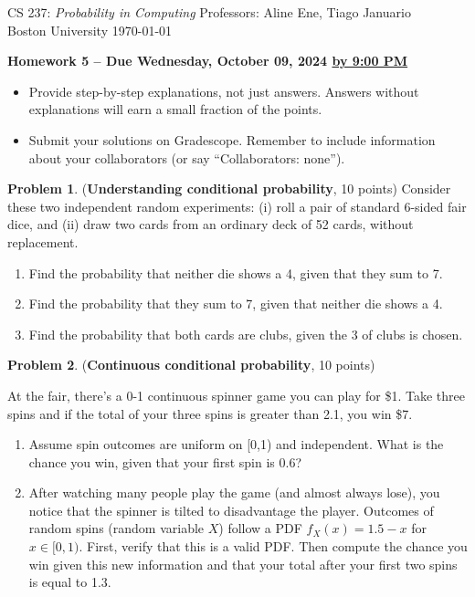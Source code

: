 \documentclass[letterpaper,11pt]{article}
\theoremstyle{plain}%
\theoremstyle{definition}
\newtheorem{problem}{Problem}
\theoremstyle{plain}%
\begin{document}
{\noindent\large
CS 237: {\em Probability in Computing} \hfill Professors: Aline Ene, Tiago Januario\\
Boston University \hfill \today\\}
\vspace{1pt} \hrulefill\vspace{3mm}
\begin{center}
{\Large\bf Homework 5 -- Due Wednesday, October 09, 2024 \underline{by 9:00 PM}}
\end{center}

\begin{itemize}
\item Provide step-by-step explanations, not just answers. Answers without explanations will earn a small fraction of the points.
\item Submit your solutions on Gradescope. Remember to include information about your collaborators (or say ``Collaborators: none'').
\end{itemize}

\vspace*{-2mm}

\begin{problem}(\textbf{Understanding conditional probability}, 10 points) Consider these two independent random experiments: (i) roll a pair of standard 6-sided fair dice, and (ii) draw two cards from an ordinary deck of 52 cards, without replacement.
    \begin{enumerate}[label=(\alph*)]
        \item Find the probability that neither die shows a 4, given that they sum to 7.
        \item Find the probability that they sum to 7, given that neither die shows a 4.
        \item Find the probability that both cards are clubs, given the 3 of clubs is chosen.
    \end{enumerate}
\end{problem}

\begin{problem} ({\bf Continuous conditional probability}, 10 points)

At the fair, there's a 0-1 continuous spinner game you can play for \$1. Take three spins and if the total of your three spins is greater than 2.1, you win \$7. 

\begin{enumerate}[label=(\alph*)]
 
\item  Assume spin outcomes are uniform on [0,1) and independent.  What is the chance you win, given that your first spin is 0.6?
\item  After watching many people play the game (and almost always lose), you notice that the spinner is tilted to disadvantage the player.  Outcomes of random spins (random variable $X$) follow a PDF $f_X(x) = 1.5 - x$ for $x \in [0,1)$. First, verify that this is a valid PDF. Then compute the chance you win given this new information and that your total after your first two spins is equal to 1.3.
\end{enumerate}

\end{problem}
\end{document}
